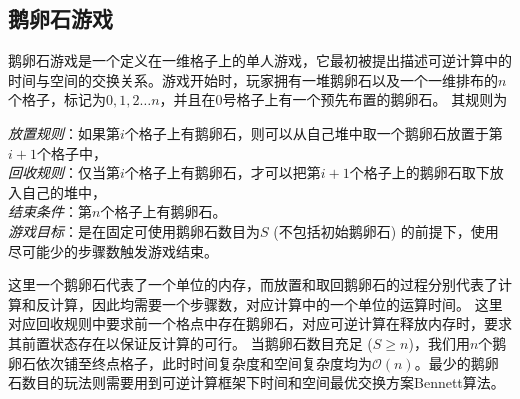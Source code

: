 \documentclass[A4,twoside,fontset=ubuntu,UTF8]{ctexart}
\newcommand{\bigO}{{\mathcal{O}}}
\begin{document}
\subsection{鹅卵石游戏}
鹅卵石游戏是一个定义在一维格子上的单人游戏，它最初被提出描述可逆计算中的时间与空间的交换关系。游戏开始时，玩家拥有一堆鹅卵石以及一个一维排布的$n$个格子，标记为$0,1,2\ldots n$，并且在$0$号格子上有一个预先布置的鹅卵石。
其规则为
\begin{tcolorbox}[width=\textwidth, title=鹅卵石游戏-可逆计算版本]
    \textit{放置规则}：如果第$i$个格子上有鹅卵石，则可以从自己堆中取一个鹅卵石放置于第$i+1$个格子中，\\
    \textit{回收规则}：仅当第$i$个格子上有鹅卵石，才可以把第$i+1$个格子上的鹅卵石取下放入自己的堆中，\\
    \textit{结束条件}：第$n$个格子上有鹅卵石。\\
    \textit{游戏目标}：是在固定可使用鹅卵石数目为$S$ (不包括初始鹅卵石) 的前提下，使用尽可能少的步骤数触发游戏结束。
\end{tcolorbox}
这里一个鹅卵石代表了一个单位的内存，而放置和取回鹅卵石的过程分别代表了计算和反计算，因此均需要一个步骤数，对应计算中的一个单位的运算时间。
这里对应回收规则中要求前一个格点中存在鹅卵石，对应可逆计算在释放内存时，要求其前置状态存在以保证反计算的可行。
当鹅卵石数目充足 ($S\geq n$)，我们用$n$个鹅卵石依次铺至终点格子，此时时间复杂度和空间复杂度均为$\bigO(n)$。最少的鹅卵石数目的玩法则需要用到可逆计算框架下时间和空间最优交换方案Bennett算法。
\end{document}
